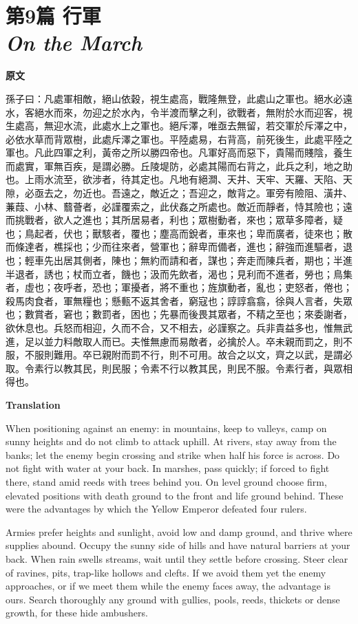 \documentclass[12pt]{book}
\newcommand{\chapterentry}[4]{%
  \chapter[\texorpdfstring{#1}{#1}]{\texorpdfstring{#1\\\Large\textit{#2}}{#1 — #2}}%
  \noindent\textbf{原文}\par
  #3

  \bigskip
  \noindent\textbf{Translation}\par
  #4
}
\begin{document}
\chapterentry{第9篇 行軍}{On the March}{%
孫子曰：凡處軍相敵，絕山依穀，視生處高，戰隆無登，此處山之軍也。絕水必遠水，客絕水而來，勿迎之於水內，令半渡而擊之利，欲戰者，無附於水而迎客，視生處高，無迎水流，此處水上之軍也。絕斥澤，唯亟去無留，若交軍於斥澤之中，必依水草而背眾樹，此處斥澤之軍也。平陸處易，右背高，前死後生，此處平陸之軍也。凡此四軍之利，黃帝之所以勝四帝也。凡軍好高而惡下，貴陽而賤陰，養生而處實，軍無百疾，是謂必勝。丘陵堤防，必處其陽而右背之，此兵之利，地之助也。上雨水流至，欲涉者，待其定也。凡地有絕澗、天井、天牢、天羅、天陷、天隙，必亟去之，勿近也。吾遠之，敵近之；吾迎之，敵背之。軍旁有險阻、潢井、蒹葭、小林、蘙薈者，必謹覆索之，此伏姦之所處也。敵近而靜者，恃其險也；遠而挑戰者，欲人之進也；其所居易者，利也；眾樹動者，來也；眾草多障者，疑也；鳥起者，伏也；獸駭者，覆也；塵高而銳者，車來也；卑而廣者，徒來也；散而條達者，樵採也；少而往來者，營軍也；辭卑而備者，進也；辭強而進驅者，退也；輕車先出居其側者，陳也；無約而請和者，謀也；奔走而陳兵者，期也；半進半退者，誘也；杖而立者，饑也；汲而先飲者，渴也；見利而不進者，勞也；鳥集者，虛也；夜呼者，恐也；軍擾者，將不重也；旌旗動者，亂也；吏怒者，倦也；殺馬肉食者，軍無糧也；懸甀不返其舍者，窮寇也；諄諄翕翕，徐與人言者，失眾也；數賞者，窘也；數罰者，困也；先暴而後畏其眾者，不精之至也；來委謝者，欲休息也。兵怒而相迎，久而不合，又不相去，必謹察之。兵非貴益多也，惟無武進，足以並力料敵取人而已。夫惟無慮而易敵者，必擒於人。卒未親而罰之，則不服，不服則難用。卒已親附而罰不行，則不可用。故合之以文，齊之以武，是謂必取。令素行以教其民，則民服；令素不行以教其民，則民不服。令素行者，與眾相得也。}{%
When positioning against an enemy: in mountains, keep to valleys, camp on sunny heights and do not climb to attack uphill. At rivers, stay away from the banks; let the enemy begin crossing and strike when half his force is across. Do not fight with water at your back. In marshes, pass quickly; if forced to fight there, stand amid reeds with trees behind you. On level ground choose firm, elevated positions with death ground to the front and life ground behind. These were the advantages by which the Yellow Emperor defeated four rulers.

Armies prefer heights and sunlight, avoid low and damp ground, and thrive where supplies abound. Occupy the sunny side of hills and have natural barriers at your back. When rain swells streams, wait until they settle before crossing. Steer clear of ravines, pits, trap-like hollows and clefts. If we avoid them yet the enemy approaches, or if we meet them while the enemy faces away, the advantage is ours. Search thoroughly any ground with gullies, pools, reeds, thickets or dense growth, for these hide ambushers.

}
\end{document}
